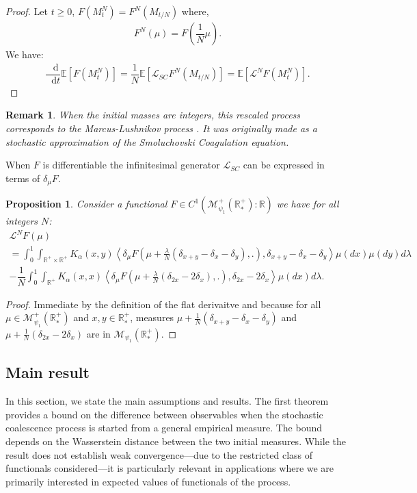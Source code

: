 \documentclass[11pt,a4paper]{article}
\newcommand{\RR}{\mathbb{R}}
\newcommand{\RRP}{\mathbb{R}^+_*}
\newcommand{\MC}{\mathcal{M}}
\newcommand{\LC}{\mathcal{L}}
\newcommand{\E}[1]{\mathbb{E}\left[#1\right]}
\newcommand{\dd}{\mathop{}\!\mathrm{d}}
\newtheorem{remark}[theorem]{Remark}
\newtheorem{proposition}[theorem]{Proposition}
\begin{document}
\begin{proof}
    Let $t \geq 0$, $F(M^N_t) = F^N(M_{t/N})$ where,
    \begin{align*}
        F^N(\mu) = F\left(\dfrac{1}{N}\mu\right).
    \end{align*}
    We have:
    \begin{align*}
        \dfrac{\dd}{\dd t}\E{F(M^N_t)}  = \dfrac{1}{N}\E{\LC_{SC} F^N\left(M_{t/N}\right)} =  \E{\LC^N F(M^N_t)}.
    \end{align*}
\end{proof}

\begin{remark}
   When the initial masses are integers, this rescaled process corresponds to the Marcus-Lushnikov process \cite{marcus1968stochastic,lushnikov1978coagulation}. It was originally made as a stochastic approximation of the Smoluchovski Coagulation equation.
\end{remark}
When $F$ is differentiable the infinitesimal generator $\LC_{SC}$ can be expressed in terms of $\delta_\mu F$.
\begin{proposition}\label{prop:SC_gen_differentiable}
    Consider a functional $F \in C^1(\MC_{\psi_1}^+\left(\RRP \right):\RR)$ we have for all integers $N$:
    \begin{multline*}
        \LC^N F(\mu)\\
         = \int_0^1 \int_{\RR^+ \times \RR^+} K_{\alpha}(x,y)\left\langle  \delta_\mu F\left(\mu + \frac{\lambda}{N}\left(\delta_{x + y} - \delta_x - \delta_y \right),.\right),\delta_{x+y} - \delta_x - \delta_y\right\rangle\mu(dx)\mu(dy)d\lambda \\
        -\dfrac{1}{N}\int_0^1\int_{\RR^+} K_{\alpha}(x,x)\left\langle  \delta_\mu F\left(\mu + \frac{\lambda}{N}\left(\delta_{2x} - 2\delta_x \right),.\right),\delta_{2x} - 2\delta_x \right\rangle\mu(dx)d\lambda.
    \end{multline*}
\end{proposition}
\begin{proof}
    Immediate by the definition of the flat derivaitve and because for all $\mu \in \MC_{\psi_1}^+\left(\RRP \right)$ and $x,y \in \RRP$, measures $\mu + \frac{1}{N}\left(\delta_{x + y} - \delta_x - \delta_y\right)$ and $\mu + \frac{1}{N}\left(\delta_{2x} - 2\delta_x \right)$ are in $\MC_{\psi_1}\left(\RRP \right)$.
\end{proof}

\subsection{Main result}
In this section, we state the main assumptions and results. The first theorem provides a bound on the difference between observables when the stochastic coalescence process is started from a general empirical measure. The bound depends on the Wasserstein distance between the two initial measures. While the result does not establish weak convergence—due to the restricted class of functionals considered—it is particularly relevant in applications where we are primarily interested in expected values of functionals of the process.
\end{document}
